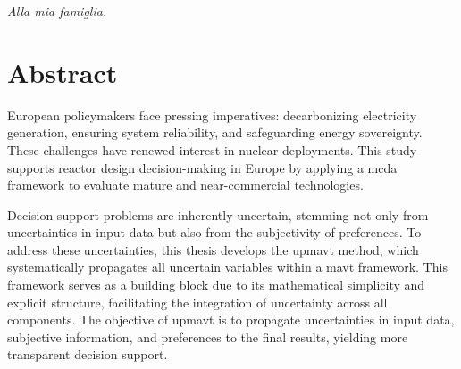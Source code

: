 \documentclass{polimi_template_classic/PoliMi3i_thesis}
\begin{document}


\pagestyle{empty} %
\frontmatter %


\clearpage
\thispagestyle{empty}
\vspace*{\fill}
\begin{flushright}
    \textit{Alla mia famiglia.}
\end{flushright}
\vspace*{\fill}
\cleardoublepage

\startpreamble
\setcounter{page}{1} %

\chapter*{Abstract} 
European policymakers face pressing imperatives: decarbonizing electricity generation, ensuring system reliability, and safeguarding energy sovereignty. These challenges have renewed interest in nuclear deployments. This study supports reactor design decision-making in Europe by applying a \gls{mcda} framework to evaluate mature and near-commercial technologies.

Decision-support problems are inherently uncertain, stemming not only from uncertainties in input data but also from the subjectivity of preferences. To address these uncertainties, this thesis develops the \gls{upmavt} method, which systematically propagates all uncertain variables within a \gls{mavt} framework. This framework serves as a building block due to its mathematical simplicity and explicit structure, facilitating the integration of uncertainty across all components. The objective of \gls{upmavt} is to propagate uncertainties in input data, subjective information, and preferences to the final results, yielding more transparent decision support.
\end{document}
